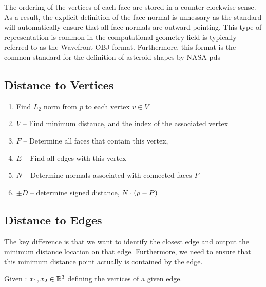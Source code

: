The ordering of the vertices of each face are stored in a counter-clockwise sense.
As a result, the explicit definition of the face normal is unnessary as the standard will automatically ensure that all face normals are outward pointing.
This type of representation is common in the computational geometry field is typically referred to as the Wavefront OBJ format.
Furthermore, this format is the common standard for the definition of asteroid shapes by NASA \gls{pds}~\cite{gaskell2008b,gaskell2008a}
\subsection{Distance to Vertices}

\begin{enumerate}
    \item Find \( L_2\) norm from \( p \) to each vertex \( v \in V\)
    \item \( V \) -- Find minimum distance, and the index of the associated vertex
    \item \( F \) -- Determine all faces that contain this vertex, 
    \item \( E \) -- Find all edges with this vertex
    \item \( N \) -- Determine normals associated with connected faces \( F \)
    \item \( \pm D\) -- determine signed distance, \( N \cdot \left( p - P \right)\)
\end{enumerate}

\subsection{Distance to Edges}
The key difference is that we want to identify the closest edge and output the minimum distance location on that edge.
Furthermore, we need to ensure that this minimum distance point actually is contained by the edge.

Given : \( x_1, x_2 \in \mathbb{R}^3\) defining the vertices of a given edge. 

